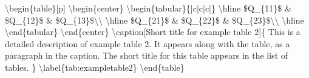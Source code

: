 \documentclass[twoside,openany]{thesis}
\begin{document}
{\ttfamily
    \textbackslash begin\{table\}[p]\linebreak
        \null\quad\textbackslash begin\{center\}\linebreak
            \null\quad\quad\textbackslash begin\{tabular\}\{|c|c|c|\}\linebreak
                \null\quad\quad\textbackslash hline\linebreak
                \null\quad\quad\$Q\_\{11\}\$ \& \$Q\_\{12\}\$ \& \$Q\_\{13\}\$\textbackslash\textbackslash\linebreak
                \null\quad\quad\textbackslash hline\linebreak
                \null\quad\quad\$Q\_\{21\}\$ \& \$Q\_\{22\}\$ \& \$Q\_\{23\}\$\textbackslash\textbackslash\linebreak
                \null\quad\quad\textbackslash hline\linebreak
            \null\quad\quad\textbackslash end\{tabular\}\linebreak
        \null\quad\textbackslash end\{center\}\linebreak
        \null\quad\textbackslash caption[Short title for example table 2]\{\linebreak
            \null\quad\quad This is a detailed description of example table 2.\linebreak
            \null\quad\quad It appears along with the table, as a paragraph in the caption.\linebreak
            \null\quad\quad The short title for this table appears in the list of tables.\linebreak
        \null\quad\}\linebreak
        \null\quad\textbackslash label\{tab:exampletable2\}\linebreak
    \textbackslash end\{table\}
}
\end{document}
